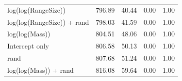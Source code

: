 \begin{table}[ht]
\begin{tabular}{@{}lrrrr@{}}
  log(log(RangeSize)) & 796.89 & 40.44 & 0.00 & 1.00 \\ 
  log(log(RangeSize)) + rand & 798.03 & 41.59 & 0.00 & 1.00 \\ 
  log(log(Mass)) & 804.51 & 48.06 & 0.00 & 1.00 \\ 
  Intercept only & 806.58 & 50.13 & 0.00 & 1.00 \\ 
  rand & 807.68 & 51.24 & 0.00 & 1.00 \\ 
  log(log(Mass)) + rand & 816.08 & 59.64 & 0.00 & 1.00 \\ 
   \bottomrule
\end{tabular}
\endgroup
\end{table}




